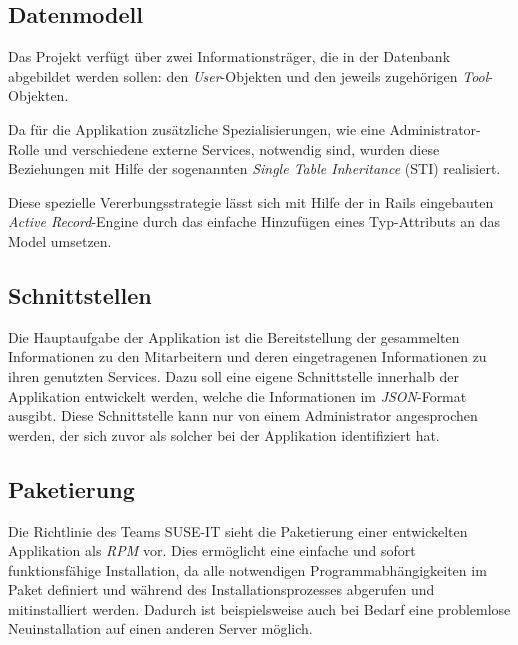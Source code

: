 \subsection{Datenmodell}
\label{sec:Datenmodell}
Das Projekt verfügt über zwei Informationsträger, die in der Datenbank abgebildet werden
sollen: den \textit{User}-Objekten und den jeweils zugehörigen \textit{Tool}-Objekten.


Da für die Applikation zusätzliche Spezialisierungen, wie eine Administrator-Rolle und verschiedene
externe Services, notwendig sind, wurden diese Beziehungen mit Hilfe der sogenannten
\textit{Single Table Inheritance} (\acs{STI}) realisiert.


Diese spezielle Vererbungsstrategie lässt sich mit Hilfe der in Rails eingebauten
\textit{Active Record}-Engine durch das einfache Hinzufügen eines Typ-Attributs an das Model
umsetzen.
\pagebreak

\subsection{Schnittstellen}
\label{sec:Schnittstellen}
Die Hauptaufgabe der Applikation ist die Bereitstellung der gesammelten Informationen zu den
Mitarbeitern und deren eingetragenen Informationen zu ihren genutzten Services. Dazu soll eine
eigene Schnittstelle innerhalb der Applikation entwickelt werden, welche die Informationen im
\textit{JSON}-Format ausgibt. Diese Schnittstelle kann nur von einem Administrator angesprochen
werden, der sich zuvor als solcher bei der Applikation identifiziert hat.


\subsection{Paketierung}
\label{sec:Paketierung}
Die Richtlinie des Teams SUSE-IT sieht die Paketierung einer entwickelten Applikation als
\textit{\acs{RPM}} vor. Dies ermöglicht eine einfache und sofort funktionsfähige Installation, da alle
notwendigen Programmabhängigkeiten im Paket definiert und während des Installationsprozesses
abgerufen und mitinstalliert werden. Dadurch ist beispielsweise auch bei Bedarf eine problemlose
Neuinstallation auf einen anderen Server möglich.
